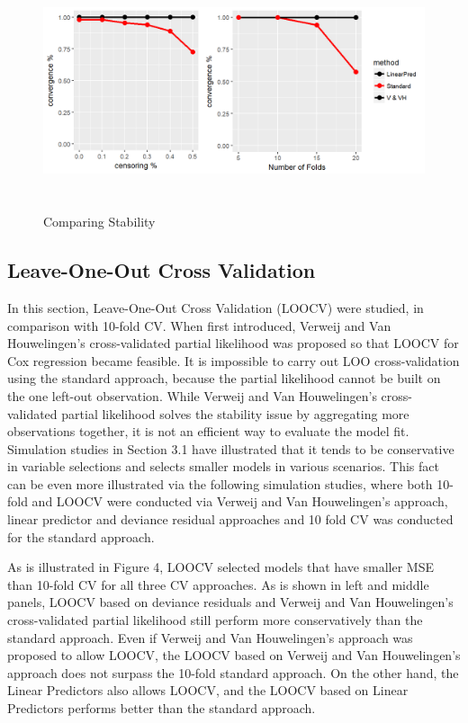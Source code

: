 \begin{figure}[h]
    \centering
		\includegraphics[height= 7cm ]{./figures/figure_3.png}
    \caption{Comparing Stability}
\end{figure}	

    \subsection {Leave-One-Out Cross Validation}
	\par In this section, Leave-One-Out Cross Validation (LOOCV) were studied, in comparison with 10-fold CV. When first introduced, Verweij and Van Houwelingen's cross-validated partial likelihood was proposed so that LOOCV for Cox regression became feasible. It is impossible to carry out LOO cross-validation using the standard approach, because the partial likelihood cannot be built on the one left-out observation. While Verweij and Van Houwelingen's cross-validated partial likelihood solves the stability issue by aggregating more observations together, it is not an efficient way to evaluate the model fit. Simulation studies in Section 3.1 have illustrated that it tends to be conservative in variable selections and selects smaller models in various scenarios. This fact can be even more illustrated via the following simulation studies, where both 10-fold and LOOCV were conducted via Verweij and Van Houwelingen's approach, linear predictor and deviance residual approaches and 10 fold CV was conducted for the standard approach.
	\par As is illustrated in Figure 4, LOOCV selected models that have smaller MSE than 10-fold CV for all three CV approaches. As is shown in left and middle panels, LOOCV based on deviance residuals and Verweij and Van Houwelingen's cross-validated partial likelihood still perform more conservatively than the standard approach. Even if Verweij and Van Houwelingen's approach was proposed to allow LOOCV, the LOOCV based on Verweij and Van Houwelingen's approach does not surpass the 10-fold standard approach. On the other hand, the Linear Predictors also allows LOOCV, and the LOOCV based on Linear Predictors performs better than the standard approach.

